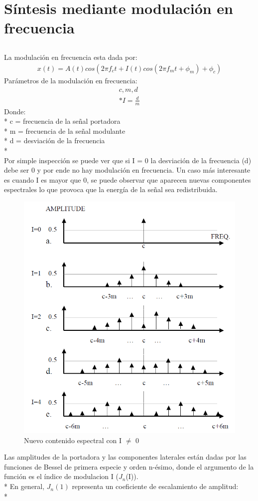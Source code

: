 \documentclass[assd_tp2_main.tex]{subfiles}
\begin{document}
\section{Síntesis mediante modulación en frecuencia}
\subsection*{}
La modulación en frecuencia esta dada por:
\begin{eqnarray*}
\textstyle x(t)=A(t)cos(2\pi f_c t+I(t)cos(2\pi f_mt+\phi_m)+\phi_c)
\end{eqnarray*}
Parámetros de la modulación en frecuencia:
\begin{eqnarray*}
\displaystyle c, m, d  \\* I=\frac{d}{m}  
\end{eqnarray*}
Donde: \\*
c = frecuencia de la señal portadora\\*
m = frecuencia de la señal modulante\\*
d = desviación de la frecuencia\\*
\\
Por simple inspección se puede ver que si I = 0 la desviación de la frecuencia (d) debe ser 0 y por ende no hay  modulación en frecuencia. Un caso más interesante es cuando I es mayor que 0, se puede observar que aparecen nuevas componentes espectrales lo que provoca que la energía de la señal sea redistribuida.  
\begin{figure}[h!]
\centering
\includegraphics[width=0.4\linewidth]{nuevasfreqs.png}
\caption{Nuevo contenido espectral con I $\neq$ 0}
\label{fig:nuevasfreqs}
\end{figure}
Las amplitudes de la portadora y las componentes laterales están dadas por las funciones de Bessel de primera especie y orden n-ésimo,
donde el argumento de la función es el índice de modulacion I ($J_{n}$(I)). \\*
En general, $J_{n}(1)$ representa un coeficiente de escalamiento de amplitud: \\*
\end{document}
